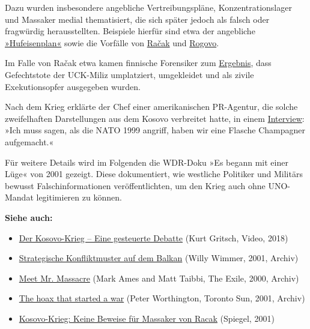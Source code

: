 Dazu wurden insbesondere angebliche Vertreibungspläne,
Konzentrationslager und Massaker medial thematisiert, die sich später
jedoch als falsch oder fragwürdig herausstellten. Beispiele hierfür sind
etwa der angebliche
\href{https://de.wikipedia.org/wiki/Hufeisenplan}{»Hufeisenplan«} sowie
die Vorfälle von
\href{https://de.wikipedia.org/wiki/Massaker_von_Ra\%C4\%8Dak}{Račak}
und \href{https://de.wikipedia.org/wiki/Rogovo-Vorfall}{Rogovo}.

Im Falle von Račak etwa kamen finnische Forensiker zum
\href{https://swprs.files.wordpress.com/2019/12/racak-massacre_peter-worthington_toronto-sun_2001.pdf}{Ergebnis},
dass Gefechtstote der UCK-Miliz umplatziert, umgekleidet und als zivile
Exekutionsopfer ausgegeben wurden.

Nach dem Krieg erklärte der Chef einer amerikanischen PR-Agentur, die
solche zweifelhaften Darstellungen aus dem Kosovo verbreitet hatte, in
einem
\href{https://www.hintergrund.de/globales/kriege/operation-balkan-werbung-fuer-krieg-und-tod/}{Interview}:
»Ich muss sagen, als die NATO 1999 angriff, haben wir eine Flasche
Champagner aufgemacht.«

Für weitere Details wird im Folgenden die WDR-Doku »Es begann mit einer
Lüge« von 2001 gezeigt. Diese dokumentiert, wie westliche Politiker und
Militärs bewusst Falschinformationen veröffentlichten, um den Krieg auch
ohne UNO-Mandat legitimieren zu können.

\textbf{Siehe auch:}

\begin{itemize}
\tightlist
\item
  \href{https://www.youtube.com/watch?v=s7JU4cwtYZU}{Der Kosovo-Krieg --
  Eine gesteuerte Debatte} (Kurt Gritsch, Video, 2018)
\item
  \href{https://swprs.files.wordpress.com/2019/12/blaetter_wimmer_interview_2001.pdf}{Strategische
  Konfliktmuster auf dem Balkan} (Willy Wimmer, 2001, Archiv)
\item
  \href{https://swprs.files.wordpress.com/2019/12/meet-mister-massacre_ames-taibbi_the-exile_2000.pdf}{Meet
  Mr. Massacre} (Mark Ames and Matt Taibbi, The Exile, 2000, Archiv)
\item
  \href{https://swprs.files.wordpress.com/2019/12/racak-massacre_peter-worthington_toronto-sun_2001.pdf}{The
  hoax that started a war} (Peter Worthington, Toronto Sun, 2001,
  Archiv)
\item
  \href{https://www.spiegel.de/politik/ausland/kosovo-krieg-keine-beweise-fuer-massaker-von-racak-a-112775.html}{Kosovo-Krieg:
  Keine Beweise für Massaker von Racak} (Spiegel, 2001)
\end{itemize}

